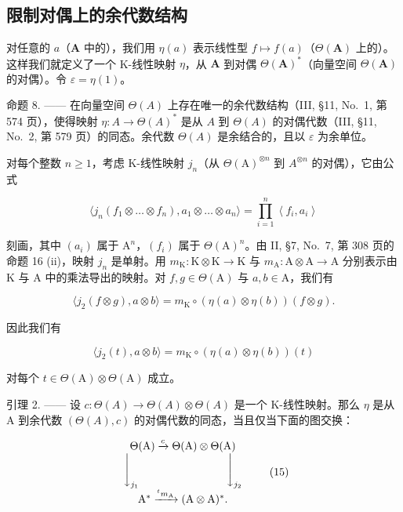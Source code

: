 \subsection{限制对偶上的余代数结构}

对任意的 \(a\)（\(\mathbf{A}\) 中的），我们用 \(\eta(a)\) 表示线性型 \(f \mapsto f(a)\)（\(\Theta(\mathbf{A})\) 上的）。这样我们就定义了一个 K-线性映射 \(\eta\)，从 \(\mathbf{A}\) 到对偶 \(\Theta(\mathbf{A})^*\)（向量空间 \(\Theta(\mathbf{A})\) 的对偶）。令 \(\varepsilon = \eta(1)\)。

命题 8. —— 在向量空间 \(\Theta(A)\) 上存在唯一的余代数结构（III, §11, No.~1, 第 574 页），使得映射 \(\eta: A \to \Theta(A)^*\) 是从 \(A\) 到 \(\Theta(A)\) 的对偶代数（III, §11, No.~2, 第 579 页）的同态。余代数 \(\Theta(A)\) 是余结合的，且以 \(\varepsilon\) 为余单位。

对每个整数 \(n \geqslant 1\)，考虑 K-线性映射 \(j_{n}\)（从 \(\Theta(\mathrm{A})^{\otimes n}\) 到 \(A^{\otimes n}\) 的对偶），它由公式

\[
\langle j _ {n} \left(f _ {1} \otimes \dots \otimes f _ {n}\right), a _ {1} \otimes \dots \otimes a _ {n} \rangle = \prod_ {i = 1} ^ {n} \left\langle f _ {i}, a _ {i} \right\rangle\tag{13}
\]

刻画，其中 \((a_{i})\) 属于 \(\mathrm{A}^n\)，\((f_i)\) 属于 \(\Theta (\mathrm{A})^n\)。由 II, §7, No.~7, 第 308 页的命题 16 (ii)，映射 \(j_{n}\) 是单射。用 \(m_{\mathrm{K}}:\mathrm{K}\otimes \mathrm{K}\to \mathrm{K}\) 与 \(m_{\mathrm{A}}:\mathrm{A}\otimes \mathrm{A}\rightarrow \mathrm{A}\) 分别表示由 K 与 A 中的乘法导出的映射。对 \(f,g\in \Theta (\mathrm{A})\) 与 \(a,b\in \mathrm{A}\)，我们有

\[
\langle j _ {2} (f \otimes g), a \otimes b \rangle = m _ {\mathrm{K}} \circ (\eta (a) \otimes \eta (b)) (f \otimes g).
\]

因此我们有

\[
\langle j _ {2} (t), a \otimes b \rangle = m _ {\mathrm{K}} \circ (\eta (a) \otimes \eta (b)) (t)\tag{14}
\]

对每个 \(t\in \Theta (\mathrm{A})\otimes \Theta (\mathrm{A})\) 成立。

引理 2. —— 设 \(c: \Theta(A) \to \Theta(A) \otimes \Theta(A)\) 是一个 K-线性映射。那么 \(\eta\) 是从 A 到余代数 \((\Theta(A), c)\) 的对偶代数的同态，当且仅当下面的图交换：

\[
\begin{array}{c} \Theta (\mathrm{A}) \xrightarrow {c} \Theta (\mathrm{A}) \otimes \Theta (\mathrm{A}) \\ \Biggl \downarrow_ {j _ {1}} \qquad \qquad \qquad \qquad \Biggl \downarrow_ {j _ {2}} \\ \mathrm{A} ^ {*} \xrightarrow {^ t m _ {\mathrm{A}}} (\mathrm{A} \otimes \mathrm{A}) ^ {*}. \end{array}\tag{15}
\]

